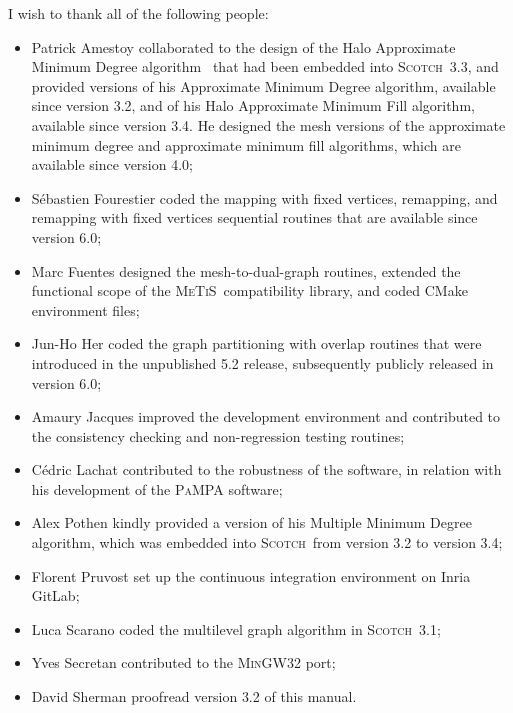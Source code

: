 \documentclass{article}
\newcommand{\scotch}{\textsc{Scotch}}               %
\newcommand{\metis}{\mbox{\textsc{Me$\!$T$\!$iS}}}  %
\begin{document}
I wish to thank all of the following people:
\begin{itemize}
\item
Patrick Amestoy collaborated to the design of the Halo Approximate
Minimum Degree algorithm~\cite{peroam99} that had been embedded into
\scotch\ \textsc{3.3}, and provided versions of his Approximate Minimum
Degree algorithm, available since version \textsc{3.2}, and of his
Halo Approximate Minimum Fill algorithm, available since version
\textsc{3.4}. He designed the mesh versions of the approximate
minimum degree and approximate minimum fill algorithms, which are
available since version \textsc{4.0};
\item
S\'ebastien Fourestier coded the mapping with fixed vertices,
remapping, and remapping with fixed vertices sequential routines that
are available since version \textsc{6.0};
\item
Marc Fuentes designed the mesh-to-dual-graph routines, extended the
functional scope of the \metis\ compatibility library, and coded CMake
environment files;
\item
Jun-Ho Her coded the graph partitioning with overlap routines that
were introduced in the unpublished \textsc{5.2} release, subsequently
publicly released in version \textsc{6.0};
\item
Amaury Jacques improved the development environment and contributed to
the consistency checking and non-regression testing routines;
\item
C\'edric Lachat contributed to the robustness of the software, in
relation with his development of the \textsc{PaMPA} software;
\item
Alex Pothen kindly provided a version of his Multiple Minimum Degree
algorithm, which was embedded into \scotch\ from version \textsc{3.2} to
version \textsc{3.4};
\item
Florent Pruvost set up the continuous integration environment on
Inria GitLab;
\item
Luca Scarano coded the multilevel graph algorithm in
\scotch\ \textsc{3.1};
\item
Yves Secretan contributed to the \textsc{MinGW32} port;
\item
David Sherman proofread version \textsc{3.2} of this manual.
\end{itemize}




\end{document}
